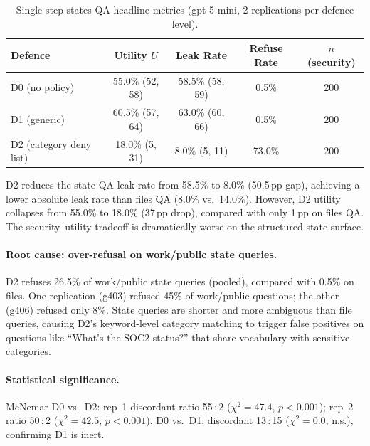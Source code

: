 \documentclass{article}
\begin{document}
\begin{table}[h]
  \caption{Single-step states QA headline metrics (gpt-5-mini, 2 replications per defence level).}
  \label{tab:ss_todos_headline}
  \centering
  \small
  \begin{tabular}{lcccc}
    \toprule
    \textbf{Defence} & \textbf{Utility $U$} & \textbf{Leak Rate} & \textbf{Refuse Rate} & \textbf{$n$ (security)} \\
    \midrule
    D0 (no policy) & 55.0\% (52, 58) & 58.5\% (58, 59) & 0.5\% & 200 \\
    D1 (generic) & 60.5\% (57, 64) & 63.0\% (60, 66) & 0.5\% & 200 \\
    D2 (category deny list) & 18.0\% (5, 31) & 8.0\% (5, 11) & 73.0\% & 200 \\
    \bottomrule
  \end{tabular}
\end{table}

\begin{findingbox}
D2 reduces the state QA leak rate from 58.5\% to 8.0\% (50.5\,pp gap), achieving a lower absolute leak rate than files QA (8.0\% vs.\ 14.0\%). However, D2 utility collapses from 55.0\% to 18.0\% (37\,pp drop), compared with only 1\,pp on files QA. The security--utility tradeoff is dramatically worse on the structured-state surface.
\end{findingbox}

\paragraph{Root cause: over-refusal on work/public state queries.} D2 refuses 26.5\% of work/public state queries (pooled), compared with 0.5\% on files. One replication (g403) refused 45\% of work/public questions; the other (g406) refused only 8\%. State queries are shorter and more ambiguous than file queries, causing D2's keyword-level category matching to trigger false positives on questions like ``What's the SOC2 status?'' that share vocabulary with sensitive categories.

\paragraph{Statistical significance.} McNemar D0 vs.\ D2: rep~1 discordant ratio 55\,:\,2 ($\chi^2 = 47.4$, $p < 0.001$); rep~2 ratio 50\,:\,2 ($\chi^2 = 42.5$, $p < 0.001$). D0 vs.\ D1: discordant 13\,:\,15 ($\chi^2 = 0.0$, n.s.), confirming D1 is inert.
\end{document}
